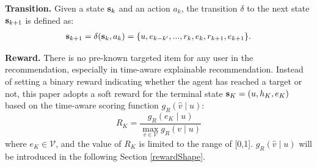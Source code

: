 \textbf{Transition.} Given a state $\textbf{s}_k$ and an action $a_k$, the transition $\delta$ to the next state $\textbf{s}_{k + 1}$ is defined as:
\begin{eqnarray}
\textbf{s}_{k+1} = \delta(\textbf{s}_k, a_k) = \{ u, e_{k-k'},...,  r_{k}, e_k, 
r_{k+1}, e_{k+1} \}.
\end{eqnarray}

\textbf{Reward.} There is no pre-known targeted item for any user in the recommendation, especially in time-aware explainable recommendation.
Instead of setting a binary reward indicating whether the agent has reached a target or not, this paper adopts a soft reward for the terminal state $\textbf{s}_K = (u, h_K, e_K)$ based on the time-aware scoring function $g_R(\hat{v}\mid u)$:
\begin{equation}\label{rewardeq}
R_{K}=\dfrac{g_R (e_{K} \mid u )}{\max _{v \in \mathcal{V}} 
g_R(v \mid u)}
\end{equation}
where $e_{K} \in \mathcal{V}$, and the value of $R_K$ is limited to the range of [0,1]. $g_R(\hat{v} \mid u)$ will be introduced in the following Section \ref{rewardShape}.






